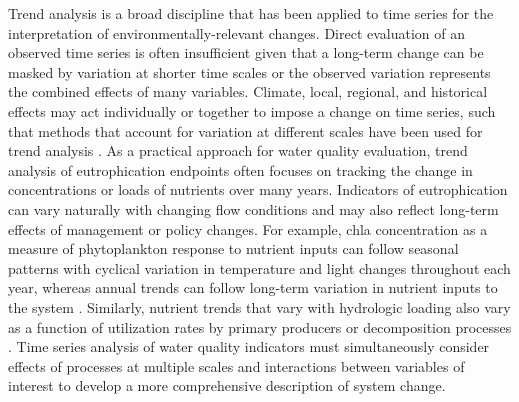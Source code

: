 \documentclass[journal = esthag, manuscript = article]{achemso}\usepackage[]{graphicx}\usepackage[]{color}
\begin{document}
Trend analysis is a broad discipline that has been applied to time series for the interpretation of environmentally-relevant changes.  Direct evaluation of an observed time series is often insufficient given that a long-term change can be masked by variation at shorter time scales or the observed variation represents the combined effects of many variables\cite{Oneill89,Levin92}. Climate, local, regional, and historical effects may act individually or together to impose a change on time series, such that methods that account for variation at different scales have been used for trend analysis \cite{Bhangu97,Champely97,Chang08,Halliday12}.  As a practical approach for water quality evaluation, trend analysis of eutrophication endpoints often focuses on tracking the change in concentrations or loads of nutrients over many years. Indicators of eutrophication can vary naturally with changing flow conditions and may also reflect long-term effects of management or policy changes. For example, \ac{chla} concentration as a measure of phytoplankton response to nutrient inputs can follow seasonal patterns with cyclical variation in temperature and light changes throughout each year, whereas annual trends can follow long-term variation in nutrient inputs to the system \cite{Cloern96,Cloern10}. Similarly, nutrient trends that vary with hydrologic loading also vary as a function of utilization rates by primary producers or decomposition processes \cite{Sakamoto89,Schultz08,Harding16}. Time series analysis of water quality indicators must simultaneously consider effects of processes at multiple scales and interactions between variables of interest to develop a more comprehensive description of system change. 
\end{document}
